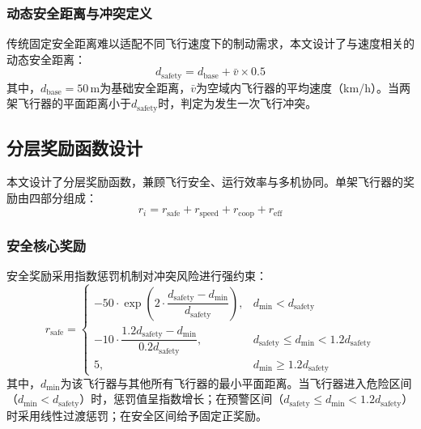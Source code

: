 \documentclass[12pt,a4paper,UTF8]{ctexart}
\begin{document}
\subsubsection{动态安全距离与冲突定义}
传统固定安全距离难以适配不同飞行速度下的制动需求\cite{ref16}，本文设计了与速度相关的动态安全距离：
\begin{equation}
    d_{\text{safety}} = d_{\text{base}} + \bar{v} \times 0.5
    \label{eq:dynamicsafety}
\end{equation}
其中，$d_{\text{base}} = 50\,\text{m}$为基础安全距离，$\bar{v}$为空域内飞行器的平均速度（km/h）。当两架飞行器的平面距离小于$d_{\text{safety}}$时，判定为发生一次飞行冲突。

\subsection{分层奖励函数设计}
本文设计了分层奖励函数，兼顾飞行安全、运行效率与多机协同。单架飞行器的奖励由四部分组成：
\begin{equation}
    r_i = r_{\text{safe}} + r_{\text{speed}} + r_{\text{coop}} + r_{\text{eff}}
\end{equation}

\subsubsection{安全核心奖励}
安全奖励采用指数惩罚机制对冲突风险进行强约束：
\begin{equation}
    r_{\text{safe}} =
    \begin{cases}
        -50 \cdot \exp\left(2 \cdot \dfrac{d_{\text{safety}} - d_{\min}}{d_{\text{safety}}}\right), & d_{\min} < d_{\text{safety}} \\[10pt]
        -10 \cdot \dfrac{1.2d_{\text{safety}} - d_{\min}}{0.2d_{\text{safety}}}, & d_{\text{safety}} \leq d_{\min} < 1.2d_{\text{safety}} \\[10pt]
        5, & d_{\min} \geq 1.2d_{\text{safety}}
    \end{cases}
    \label{eq:rsafe}
\end{equation}
其中，$d_{\min}$为该飞行器与其他所有飞行器的最小平面距离。当飞行器进入危险区间（$d_{\min} < d_{\text{safety}}$）时，惩罚值呈指数增长；在预警区间（$d_{\text{safety}} \leq d_{\min} < 1.2d_{\text{safety}}$）时采用线性过渡惩罚；在安全区间给予固定正奖励。
\end{document}
